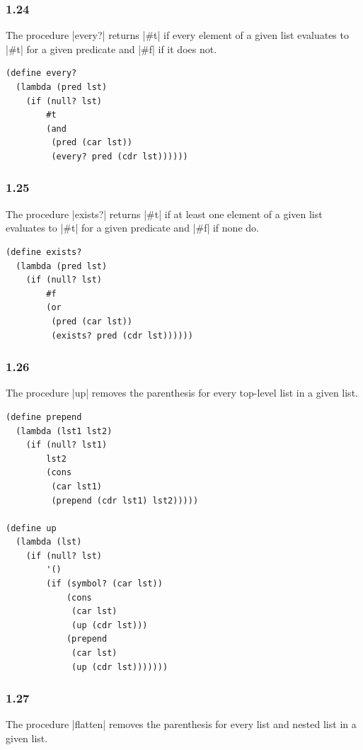 \documentclass[a4paper]{article}
\begin{document}
\subsubsection*{1.24}

The procedure |every?| returns |#t| if every element of a given list evaluates to |#t| for a given predicate and |#f| if it does not.

\begin{lstlisting}
(define every?
  (lambda (pred lst)
    (if (null? lst)
        #t
        (and
         (pred (car lst))
         (every? pred (cdr lst))))))
\end{lstlisting}

\subsubsection*{1.25}

The procedure |exists?| returns |#t| if at least one element of a given list evaluates to |#t| for a given predicate and |#f| if none do.

\begin{lstlisting}
(define exists?
  (lambda (pred lst)
    (if (null? lst)
        #f
        (or
         (pred (car lst))
         (exists? pred (cdr lst))))))
\end{lstlisting}

\subsubsection*{1.26}

The procedure |up| removes the parenthesis for every top-level list in a given list.

\begin{lstlisting}
(define prepend
  (lambda (lst1 lst2)
    (if (null? lst1)
        lst2
        (cons
         (car lst1)
         (prepend (cdr lst1) lst2)))))

(define up
  (lambda (lst)
    (if (null? lst)
        '()
        (if (symbol? (car lst))
            (cons
             (car lst)
             (up (cdr lst)))
            (prepend
             (car lst)
             (up (cdr lst)))))))
\end{lstlisting}

\subsubsection*{1.27}

The procedure |flatten| removes the parenthesis for every list and nested list in a given list.
\end{document}
